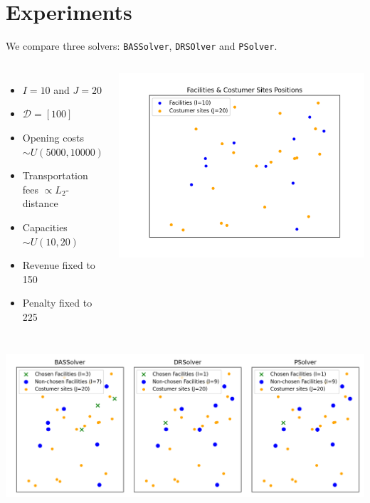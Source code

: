 \documentclass{beamer}
\newcommand{\Dcal}{\mathcal{D}}
\begin{document}
\section{Experiments} %
\begin{frame}[allowframebreaks]
	We compare three solvers: \texttt{BASSolver}, \texttt{DRSOlver} and \texttt{PSolver}.
	\begin{columns}
		\begin{itemize}
			\item $I = 10$ and $J = 20$
			\item $\Dcal = [100]$
			\item Opening costs $\sim U(5000, 10000)$
			\item Transportation fees $\propto L_2$-distance
			\item Capacities $\sim U(10, 20)$
			\item Revenue fixed to 150
			\item Penalty fixed to 225
		\end{itemize}
		
		\includegraphics[width=\textwidth]{../figure/facility_costumer_site_pos.png}
	\end{columns}
	
	\framebreak
	\includegraphics[width=\textwidth]{../figure/chosen_facility_costumer_site_pos.png}
	

\end{frame}
\end{document}
